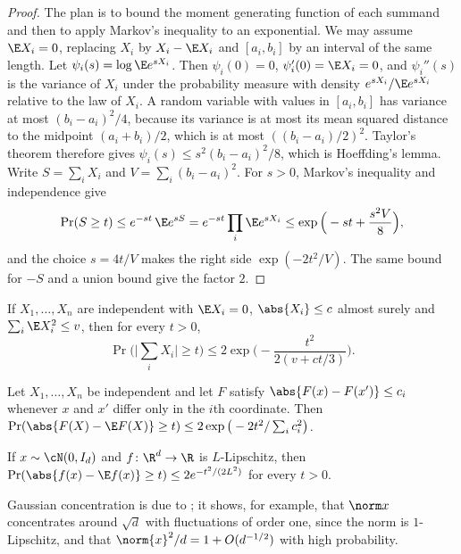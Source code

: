 \begin{refsection}
\begin{proof}
The plan is to bound the moment generating function of each summand and then to apply Markov's inequality to an exponential. We may assume $\E X_i=0$, replacing $X_i$ by $X_i-\E X_i$ and $[a_i,b_i]$ by an interval of the same length. Let $\psi_i(s)=\log\E e^{sX_i}$. Then $\psi_i(0)=0$, $\psi_i'(0)=\E X_i=0$, and $\psi_i''(s)$ is the variance of $X_i$ under the probability measure with density $e^{sX_i}/\E e^{sX_i}$ relative to the law of $X_i$. A random variable with values in $[a_i,b_i]$ has variance at most $(b_i-a_i)^2/4$, because its variance is at most its mean squared distance to the midpoint $(a_i+b_i)/2$, which is at most $((b_i-a_i)/2)^2$. Taylor's theorem therefore gives $\psi_i(s)\le s^2(b_i-a_i)^2/8$, which is Hoeffding's lemma. Write $S=\sum_iX_i$ and $V=\sum_i(b_i-a_i)^2$. For $s>0$, Markov's inequality and independence give
\[
  \Pr(S\ge t)\le e^{-st}\,\E e^{sS}=e^{-st}\prod_i\E e^{sX_i}\le\exp\Big(-st+\frac{s^2V}8\Big),
\]
and the choice $s=4t/V$ makes the right side $\exp(-2t^2/V)$. The same bound for $-S$ and a union bound give the factor $2$.
\end{proof}

\begin{theorem}\label{thm:toolkit:bernstein}
If $X_1,\dots,X_n$ are independent with $\E X_i=0$, $\abs{X_i}\le c$ almost surely and $\sum_i\E X_i^2\le v$, then for every $t>0$,
\[
  \Pr\Big(\Big|\sum_iX_i\Big|\ge t\Big)\le2\exp\Big(-\frac{t^2}{2(v+ct/3)}\Big).
\]
\end{theorem}

\begin{theorem}\label{thm:toolkit:mcdiarmid}
Let $X_1,\dots,X_n$ be independent and let $F$ satisfy $\abs{F(x)-F(x')}\le c_i$ whenever $x$ and $x'$ differ only in the $i$th coordinate. Then $\Pr(\abs{F(X)-\E F(X)}\ge t)\le2\exp\big(-2t^2/\sum_ic_i^2\big)$.
\end{theorem}

\begin{theorem}\label{thm:toolkit:gauss-conc}
If $x\sim\cN(0,I_d)$ and $f\colon\R^d\to\R$ is $L$-Lipschitz, then $\Pr(\abs{f(x)-\E f(x)}\ge t)\le2e^{-t^2/(2L^2)}$ for every $t>0$.
\end{theorem}

Gaussian concentration is due to \textcite{TsirelsonIbragimovSudakov1976}; it shows, for example, that $\norm x$ concentrates around $\sqrt d$ with fluctuations of order one, since the norm is $1$-Lipschitz, and that $\norm{x}^2/d=1+O(d^{-1/2})$ with high probability.


\end{refsection}
